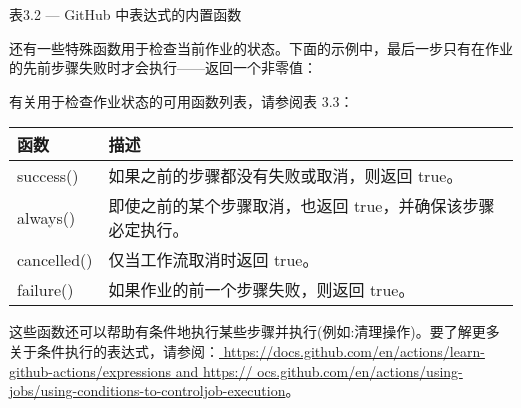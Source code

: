 \begin{center}
表3.2 --- GitHub 中表达式的内置函数
\end{center}


还有一些特殊函数用于检查当前作业的状态。下面的示例中，最后一步只有在作业的先前步骤失败时才会执行——返回一个非零值：


有关用于检查作业状态的可用函数列表，请参阅表 3.3：

\begin{longtable}[c]{|>{\centering\arraybackslash}p{3cm}|>{\centering\arraybackslash}p{12cm}|}
\hline
\textbf{函数} & \textbf{描述}                                   \\ \hline
\endfirsthead
%
\endhead
%
success() & 如果之前的步骤都没有失败或取消，则返回 true。                               \\ \hline
always()  & 即使之前的某个步骤取消，也返回 true，并确保该步骤必定执行。 \\ \hline
cancelled()       & 仅当工作流取消时返回 true。        \\ \hline
failure()         & 如果作业的前一个步骤失败，则返回 true。 \\ \hline
\end{longtable}

这些函数还可以帮助有条件地执行某些步骤并执行(例如:清理操作)。要了解更多关于条件执行的表达式，请参阅：\url{ https://docs.github.com/en/actions/learn-github-actions/expressions and https:// ocs.github.com/en/actions/using-jobs/using-conditions-to-controljob-execution}。




